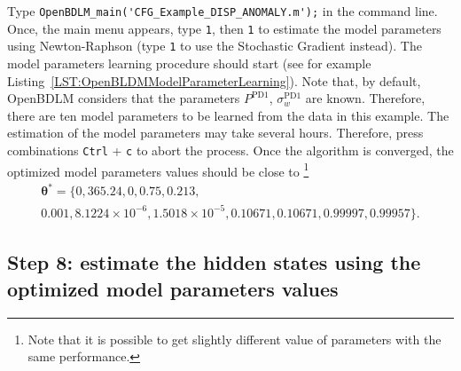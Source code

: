 Type \colorbox{light-gray}{\lstinline[basicstyle = \mlttfamily \small, backgroundcolor = \color{light-gray}]!OpenBDLM_main('CFG_Example_DISP_ANOMALY.m');!} in the \MATLAB{} command line.
Once, the main menu appears, type  \colorbox{light-gray}{\lstinline[basicstyle = \mlttfamily \small, backgroundcolor = \color{light-gray}]!1!}, then \colorbox{light-gray}{\lstinline[basicstyle = \mlttfamily \small, backgroundcolor = \color{light-gray}]!1!} to estimate the model parameters using Newton-Raphson (type  \colorbox{light-gray}{\lstinline[basicstyle = \mlttfamily \small, backgroundcolor = \color{light-gray}]!1!} to use the Stochastic Gradient instead).
The model parameters learning procedure should start (see for example Listing~\ref{LST:OpenBLDMModelParameterLearning}).
Note that, by default, OpenBDLM considers that the parameters $P^{\text{PD1}}$, $\sigma_{w}^{\text{PD1}}$ are known.
Therefore, there are ten model parameters to be learned from the data in this example.
The estimation of the model parameters may take several hours.
Therefore, press combinations \colorbox{light-gray}{\lstinline[basicstyle = \mlttfamily \small, backgroundcolor = \color{light-gray}]!Ctrl!} + \colorbox{light-gray}{\lstinline[basicstyle = \mlttfamily \small, backgroundcolor = \color{light-gray}]!c!} to abort the process.
Once the algorithm is converged, the optimized model parameters values should be close to  \footnote{Note that it is possible to get slightly different value of parameters with the same performance.}
\begin{gather*}
\bm\theta^{\text{*}}=\{0, 365.24, 0, 0.75, 0.213, \\
0.001, 8.1224\times10^{-6}, 1.5018\times10^{-5}, 0.10671, 0.10671, 0.99997, 0.99957\}.
\end{gather*}


\subsection{Step 8: estimate the hidden states using the optimized model parameters values}

